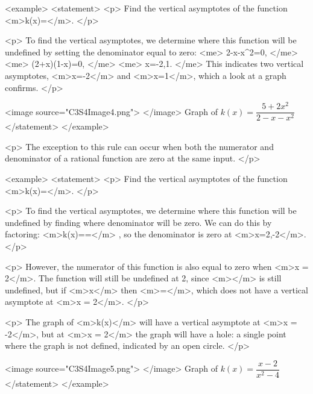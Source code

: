         <example>
            <statement>
                <p>
                    Find the vertical asymptotes of the function <m>k(x)=</m>.
                </p>

                <p>
                    To find the vertical asymptotes, we determine where this function will be undefined by setting the denominator equal to zero:
                    <me>
                        2-x-x^{2}=0,
                    </me>
                    <me>
                        (2+x)(1-x)=0,
                    </me>
                    <me>
                        x=-2,1.
                    </me>
                    This indicates two vertical asymptotes, <m>x=-2</m> and <m>x=1</m>, which a look at a graph confirms.
                </p>

                <image source="C3S4Image4.png">
                </image>
                Graph of $k(x)=\dfrac{5+2x^2}{2-x-x^2}$
            </statement>
        </example>

        <p>
            The exception to this rule can occur when both the numerator and denominator of a rational function are zero at the same input.
        </p>

        <example>
            <statement>
                <p>
                    Find the vertical asymptotes of the function <m>k(x)=</m>.
                </p>

                <p>
                    To find the vertical asymptotes, we determine where this function will be undefined by finding where denominator will be zero.
                    We can do this by factoring: <m>k(x)==</m> , so the denominator is zero at <m>x=2,-2</m>.
                </p>

                <p>
                    However, the numerator of this function is also equal to zero when <m>x = 2</m>.
                    The function will still be undefined at 2, since <m></m> is still undefined, but if <m>x</m> then <m>=</m>, which does not have a vertical asymptote at <m>x = 2</m>.
                </p>

                <p>
                    The graph of <m>k(x)</m> will have a vertical asymptote at <m>x = -2</m>, but at <m>x = 2</m> the graph will have a hole: a single point where the graph is not defined, indicated by an open circle.
                </p>

                <image source="C3S4Image5.png">
                </image>
                Graph of $k(x)=\dfrac{x-2}{x^2-4}$
            </statement>
        </example>

